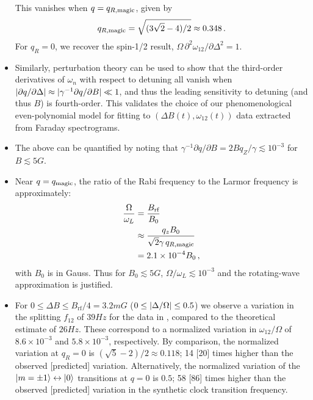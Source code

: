 \documentclass[aps,prl,reprint,superscriptaddress,floatfix]{revtex4-1}
\begin{document}
\begin{itemize}
    This vanishes when $q = q_{R,\text{magic}}$, given by
    \[
    q_{R,\text{magic}} = \sqrt{(3\sqrt{2} - 4)/2} \approx 0.348 \, .
    \]
    For $q_R = 0$, we recover the spin-1/2 result, $\Omega\, \partial^2\omega_{12}/\partial \Delta^2 = 1$.
    \item Similarly, perturbation theory can be used to show that the third-order derivatives of $\omega_n$ with respect to detuning all vanish when $\vert \partial q / \partial \Delta \vert  \approx \vert \gamma^{-1} \partial q / \partial B \vert  \ll 1$, and thus the leading sensitivity to detuning (and thus $B$) is fourth-order. This validates the choice of our phenomenological even-polynomial model for fitting to $(\Delta B(t), \omega_{12}(t))$ data extracted from Faraday spectrograms.
    \item The above can be quantified by noting that $\gamma^{-1} \partial q / \partial B = 2 B q_Z / \gamma \lesssim 10^{-3}$ for $B \lesssim 5\unit{G}$.
    \item Near $q = q_{\text{magic}}$, the ratio of the Rabi frequency to the Larmor frequency is approximately:
    \begin{align*}
        \frac{\Omega}{\omega_L} &= \frac{B_\text{rf}}{B_0} \\
                                &\approx \frac{q_z B_0}{\sqrt{2} \gamma \, q_{R,\text{magic}}} \\
                                &= 2.1\times10^{-4} B_0 \, ,
    \end{align*}
    with $B_0$ is in Gauss.
    Thus for $B_0 \lesssim 5\unit{G}$, $\Omega/\omega_L \lesssim 10^{-3}$ and the rotating-wave approximation is justified.
    \item For $0 \leq \Delta B \leq B_{\text{rf}}/4 = 3.2\unit{mG}$ ($0 \leq \vert \Delta/\Omega \vert  \leq 0.5$) we observe a variation in the splitting $f_{12}$ of $39\unit{Hz}$ for the data in , compared to the theoretical estimate of $26\unit{Hz}$.
    These correspond to a normalized variation in $\omega_{12}/\Omega$ of $8.6\times10^{-3}$ and $5.8\times10^{-3}$, respectively.
    By comparison, the normalized variation at $q_R=0$ is $(\sqrt{5}-2)/2 \approx 0.118$; 14 [20] times higher than the observed [predicted] variation.
    Alternatively, the normalized variation of the $\vert m=\pm1 \rangle  \leftrightarrow \vert 0 \rangle $ transitions at $q=0$ is $0.5$; 58 [86] times higher than the observed [predicted] variation in the synthetic clock transition frequency.

\end{itemize}
\end{document}

